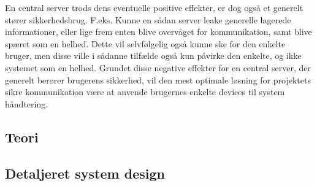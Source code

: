 En central server trods dens eventuelle positive effekter, er dog også et generelt stører sikkerhedsbrug. F.eks. Kunne en sådan server leake generelle lagerede informationer, eller lige frem enten blive overvåget for kommunikation, samt blive spæret som en helhed. Dette vil selvfølgelig også kunne ske for den enkelte bruger, men disse ville i sådanne tilfælde også kun påvirke den enkelte, og ikke systemet som en helhed. Grundet disse negative effekter for en central server, der generelt berører brugerens sikkerhed, vil den mest optimale løsning for projektets sikre kommunikation være at anvende brugernes enkelte devices til system håndtering.


\subsection{Teori}






\subsection{Detaljeret system design}


